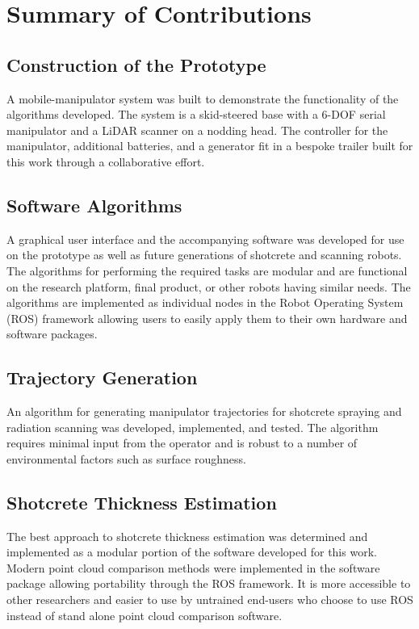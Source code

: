 \section{Summary of Contributions}
\label{sec:contributions}

\subsection{Construction of the Prototype}
A mobile-manipulator system was built to demonstrate the functionality of the algorithms developed. The system is a skid-steered base with a 6-DOF serial manipulator and a LiDAR scanner on a nodding head. The controller for the manipulator, additional batteries, and a generator fit in a bespoke trailer built for this work through a collaborative effort.\\

\subsection{Software Algorithms}
A graphical user interface and the accompanying software was developed for use on the prototype as well as future generations of shotcrete and scanning robots. The algorithms for performing the required tasks are modular and are functional on the research platform, final product, or other robots having similar needs. The algorithms are implemented as individual nodes in the Robot Operating System (ROS) framework allowing users to easily apply them to their own hardware and software packages.\\

\subsection{Trajectory Generation}
An algorithm for generating manipulator trajectories for shotcrete spraying and radiation scanning was developed, implemented, and tested. The algorithm requires minimal input from the operator and is robust to a number of environmental factors such as surface roughness.\\

\subsection{Shotcrete Thickness Estimation}
The best approach to shotcrete thickness estimation was determined and implemented as a modular portion of the software developed for this work. Modern point cloud comparison methods were implemented in the software package allowing portability through the ROS framework. It is more accessible to other researchers and easier to use by untrained end-users who choose to use ROS instead of stand alone point cloud comparison software.

